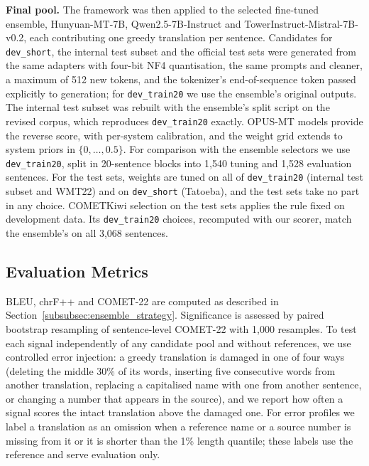 \documentclass[11pt]{article}
\begin{document}
\textbf{Final pool.} The framework was then applied to the selected fine-tuned ensemble, Hunyuan-MT-7B, Qwen2.5-7B-Instruct and TowerInstruct-Mistral-7B-v0.2, each contributing one greedy translation per sentence. Candidates for \texttt{dev\_short}, the internal test subset and the official test sets were generated from the same adapters with four-bit NF4 quantisation, the same prompts and cleaner, a maximum of 512 new tokens, and the tokenizer's end-of-sequence token passed explicitly to generation; for \texttt{dev\_train20} we use the ensemble's original outputs. The internal test subset was rebuilt with the ensemble's split script on the revised corpus, which reproduces \texttt{dev\_train20} exactly. OPUS-MT models provide the reverse score, with per-system calibration, and the weight grid extends to system priors in $\{0,\dots,0.5\}$. For comparison with the ensemble selectors we use \texttt{dev\_train20}, split in 20-sentence blocks into 1,540 tuning and 1,528 evaluation sentences. For the test sets, weights are tuned on all of \texttt{dev\_train20} (internal test subset and WMT22) and on \texttt{dev\_short} (Tatoeba), and the test sets take no part in any choice. COMETKiwi selection on the test sets applies the rule fixed on development data. Its \texttt{dev\_train20} choices, recomputed with our scorer, match the ensemble's on all 3,068 sentences.

\subsection{Evaluation Metrics}
\label{subsec:metrics}
BLEU, chrF++ and COMET-22 are computed as described in Section~\ref{subsubsec:ensemble_strategy}. Significance is assessed by paired bootstrap resampling \citep{koehn-2004-statistical} of sentence-level COMET-22 with 1,000 resamples. To test each signal independently of any candidate pool and without references, we use controlled error injection: a greedy translation is damaged in one of four ways (deleting the middle 30\% of its words, inserting five consecutive words from another translation, replacing a capitalised name with one from another sentence, or changing a number that appears in the source), and we report how often a signal scores the intact translation above the damaged one. For error profiles we label a translation as an omission when a reference name or a source number is missing from it or it is shorter than the 1\% length quantile; these labels use the reference and serve evaluation only.
\end{document}
